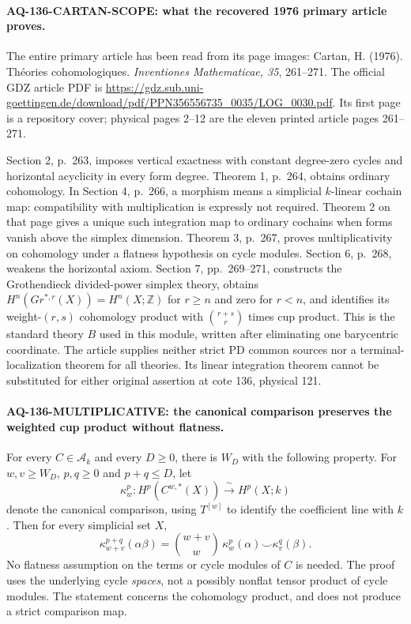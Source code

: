 \paragraph{AQ-136-CARTAN-SCOPE: what the recovered 1976 primary article proves.}
The entire primary article has been read from its page images:
Cartan, H. (1976). Th\'eories cohomologiques. \emph{Inventiones
Mathematicae, 35}, 261--271. The official GDZ article PDF is
\url{https://gdz.sub.uni-goettingen.de/download/pdf/PPN356556735_0035/LOG_0030.pdf}.
Its first page is a repository cover; physical pages 2--12
are the eleven printed article pages 261--271.

Section 2, p.~263, imposes vertical exactness with constant
degree-zero cycles and horizontal acyclicity in every form
degree. Theorem 1, p.~264, obtains ordinary cohomology.
In Section 4, p.~266, a morphism means a simplicial
$k$-linear cochain map: compatibility with multiplication
is expressly not required. Theorem 2 on that page gives
a unique such integration map to ordinary cochains when
forms vanish above the simplex dimension. Theorem 3,
p.~267, proves multiplicativity on cohomology under a
flatness hypothesis on cycle modules. Section 6, p.~268,
weakens the horizontal axiom. Section 7, pp.~269--271,
constructs the Grothendieck divided-power simplex theory,
obtains $H^n(Gr^{*,r}(X))=H^n(X;\mathbb Z)$ for $r\ge n$
and zero for $r<n$, and identifies its weight-$(r,s)$
cohomology product with $\binom{r+s}{r}$ times cup product.
This is the standard theory $B$ used in this module,
written after eliminating one barycentric coordinate.
The article supplies neither strict PD common sources
nor a terminal-localization theorem for all theories.
Its linear integration theorem cannot be substituted for
either original assertion at cote 136, physical 121.

\paragraph{AQ-136-MULTIPLICATIVE: the canonical comparison preserves the weighted cup product without flatness.}
For every $C\in\mathcal A_k$ and every $D\ge0$, there is
$W_D$ with the following property. For $w,v\ge W_D$,
$p,q\ge0$ and $p+q\le D$, let
\[
 \kappa_w^p:H^p(C^{w,*}(X))\xrightarrow{\ \sim\ }H^p(X;k)
                                                               \tag{136.M1}
\]
denote the canonical comparison, using $T^{[w]}$ to
identify the coefficient line with $k$. Then for every
simplicial set $X$,
\[
 \kappa_{w+v}^{p+q}(\alpha\beta)
   =\binom{w+v}{w}\,
                 \kappa_w^p(\alpha)\smile\kappa_v^q(\beta).
                                                               \tag{136.M2}
\]
No flatness assumption on the terms or cycle modules of
$C$ is needed. The proof uses the underlying cycle
\emph{spaces}, not a possibly nonflat tensor product of
cycle modules. The statement concerns the cohomology
product, and does not produce a strict comparison map.

